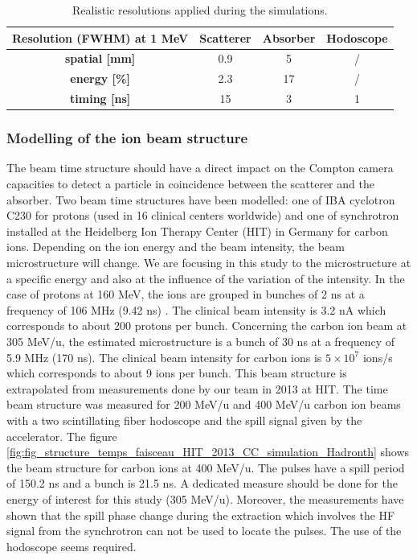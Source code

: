 \documentclass[11pt]{iopart}
\begin{document}
\begin{table} [!htbp]
\centering
\caption{Realistic resolutions applied during the simulations.}
\begin{tabular}{cccc}
\hline
\textbf{Resolution (FWHM) at 1 MeV} & \textbf{Scatterer} & \textbf{Absorber} &\textbf{Hodoscope}\\
\hline 
\textbf{spatial [mm]	}			 &     0.9		 &  5	 			&   /	\\
\textbf{energy [\%]}				&	2.3		&  17				&   /     \\
\textbf{timing [ns]}	        			&	15		&	3 			&  1     \\
\hline
\end{tabular}
\label{table:table_resolution_detecteurs_CC_simulation_Hadronth}
\end{table}

\subsubsection{Modelling of the ion beam structure}
\label{subsubsection:modelisation_fasceau_ions_CC_hadrontherapy_Geant4}
 


The beam time structure should have a direct impact on the Compton camera capacities to detect a particle in coincidence between the scatterer and the absorber.
Two beam time structures have been modelled: one of IBA cyclotron C230 for protons (used in 16 clinical centers worldwide) and one of synchrotron installed at the Heidelberg Ion Therapy Center (HIT) in Germany for carbon ions. Depending on the ion energy and the beam intensity, the beam microstructure will change. We are focusing in this study to the microstructure at a specific energy and also at the influence of the variation of the intensity. In the case of protons at 160 MeV, the ions are grouped in bunches of 2 ns at a frequency of 106 MHz (9.42 ns) \cite{f_roellinghoff_real-time_2014}. The clinical beam intensity is 3.2 nA which corresponds to about 200 protons per bunch. Concerning the carbon ion beam at 305 MeV/u, the estimated microstructure is a bunch of 30 ns at a frequency of 5.9 MHz (170 ns). The clinical beam intensity for carbon ions is $5\times10^7$ ions/s which corresponds to about 9 ions per bunch. This beam structure is extrapolated from measurements done by our team in 2013 at HIT. The time beam structure was measured for 200 MeV/u and 400 MeV/u carbon ion beams with a two scintillating fiber hodoscope and the spill signal given by the accelerator. The figure \ref{fig:fig_structure_temps_faisceau_HIT_2013_CC_simulation_Hadronth} shows the beam structure for carbon ions at 400 MeV/u. The pulses have a spill period of 150.2 ns and a bunch is 21.5 ns. A dedicated measure should be done for the energy of interest for this study (305 MeV/u).\newline
Moreover, the measurements have shown that the spill phase change during the extraction which involves  the HF signal from the synchrotron can not be used to locate the pulses. The use of the hodoscope seems required.\newline
\end{document}
